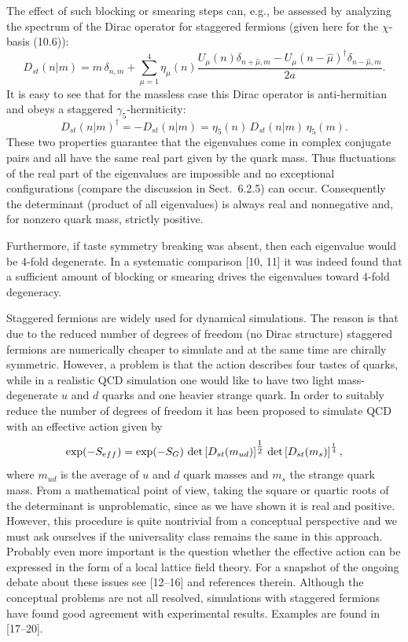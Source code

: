 The effect of such blocking or smearing steps can, e.g., be assessed by
analyzing the spectrum of the Dirac operator for staggered fermions (given
here for the $\chi$-basis (10.6)):
\begin{equation}
  D_{st}(n|m) = m\,\delta_{n,m} +
  \sum_{\mu=1}^{4} \eta_\mu(n)
  \frac{U_\mu(n)\delta_{n+\hat\mu,m}
  - U_\mu(n-\hat\mu)^{\dagger}\delta_{n-\hat\mu,m}}{2a} .
\end{equation}
It is easy to see that for the massless case this Dirac operator is
anti-hermitian and obeys a staggered $\gamma_5$-hermiticity:
\begin{equation}
  D_{st}(n|m)^{\dagger} = -D_{st}(n|m) =
  \eta_5(n)\,D_{st}(n|m)\,\eta_5(m) .
\end{equation}
These two properties guarantee that the eigenvalues come in complex conjugate
pairs and all have the same real part given by the quark mass. Thus
fluctuations of the real part of the eigenvalues are impossible and no
exceptional configurations (compare the discussion in Sect.~6.2.5) can occur.
Consequently the determinant (product of all eigenvalues) is always real and
nonnegative and, for nonzero quark mass, strictly positive.

Furthermore, if taste symmetry breaking was absent, then each eigenvalue would
be 4-fold degenerate. In a systematic comparison [10, 11] it was indeed found
that a sufficient amount of blocking or smearing drives the eigenvalues toward
4-fold degeneracy.

Staggered fermions are widely used for dynamical simulations. The reason is
that due to the reduced number of degrees of freedom (no Dirac structure)
staggered fermions are numerically cheaper to simulate and at the same time
are chirally symmetric. However, a problem is that the action describes four
tastes of quarks, while in a realistic QCD simulation one would like to have
two light mass-degenerate $u$ and $d$ quarks and one heavier strange quark. In
order to suitably reduce the number of degrees of freedom it has been proposed
to simulate QCD with an effective action given by
\begin{equation}
  \exp(-S_{eff}) = \exp(-S_G)\,
  \det\left[D_{st}(m_{ud})\right]^{\tfrac{1}{2}}\,
  \det\left[D_{st}(m_s)\right]^{\frac{1}{4}} ,
\end{equation}
where $m_{ud}$ is the average of $u$ and $d$ quark masses and $m_s$ the
strange quark mass. From a mathematical point of view, taking the square or
quartic roots of the determinant is unproblematic, since as we have shown it
is real and positive. However, this procedure is quite nontrivial from a
conceptual perspective and we must ask ourselves if the universality class
remains the same in this approach. Probably even more important is the
question whether the effective action can be expressed in the form of a local
lattice field theory. For a snapshot of the ongoing debate about these issues
see [12--16] and references therein. Although the conceptual problems are not
all resolved, simulations with staggered fermions have found good agreement
with experimental results. Examples are found in [17--20].

